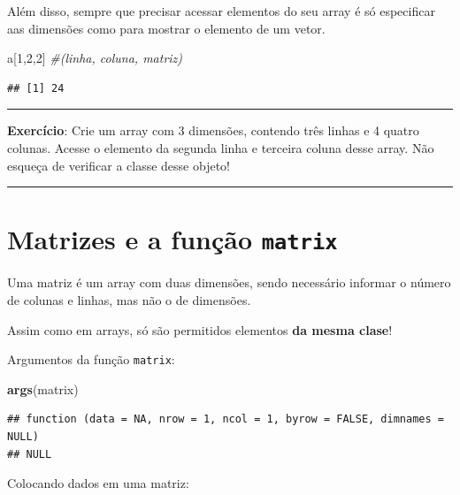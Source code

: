 \documentclass[]{book}
\newenvironment{Shaded}{\begin{snugshade}}{\end{snugshade}}
\newcommand{\KeywordTok}[1]{\textcolor[rgb]{0.13,0.29,0.53}{\textbf{#1}}}
\newcommand{\DecValTok}[1]{\textcolor[rgb]{0.00,0.00,0.81}{#1}}
\newcommand{\CommentTok}[1]{\textcolor[rgb]{0.56,0.35,0.01}{\textit{#1}}}
\newcommand{\NormalTok}[1]{#1}
\theoremstyle{definition}
\theoremstyle{definition}
\theoremstyle{definition}
\theoremstyle{remark}
\begin{document}
Além disso, sempre que precisar acessar elementos do seu array é só
especificar aas dimensões como para mostrar o elemento de um vetor.

\begin{Shaded}
\begin{Highlighting}[]
\NormalTok{a[}\DecValTok{1}\NormalTok{,}\DecValTok{2}\NormalTok{,}\DecValTok{2}\NormalTok{] }\CommentTok{#(linha, coluna, matriz)}
\end{Highlighting}
\end{Shaded}

\begin{verbatim}
## [1] 24
\end{verbatim}

\begin{center}\rule{0.5\linewidth}{\linethickness}\end{center}

{\textbf{Exercício}: Crie um array com 3 dimensões, contendo três linhas
e 4 quatro colunas. Acesse o elemento da segunda linha e terceira coluna
desse array. Não esqueça de verificar a classe desse objeto!}

\begin{center}\rule{0.5\linewidth}{\linethickness}\end{center}

\section{\texorpdfstring{Matrizes e a função
\texttt{matrix}}{Matrizes e a função matrix}}\label{matrizes-e-a-funcao-matrix}

Uma matriz é um array com duas dimensões, sendo necessário informar o
número de colunas e linhas, mas não o de dimensões.

Assim como em arrays, só são permitidos elementos \textbf{da mesma
clase}!

Argumentos da função \texttt{matrix}:

\begin{Shaded}
\begin{Highlighting}[]
\KeywordTok{args}\NormalTok{(matrix)}
\end{Highlighting}
\end{Shaded}

\begin{verbatim}
## function (data = NA, nrow = 1, ncol = 1, byrow = FALSE, dimnames = NULL) 
## NULL
\end{verbatim}

Colocando dados em uma matriz:
\end{document}
